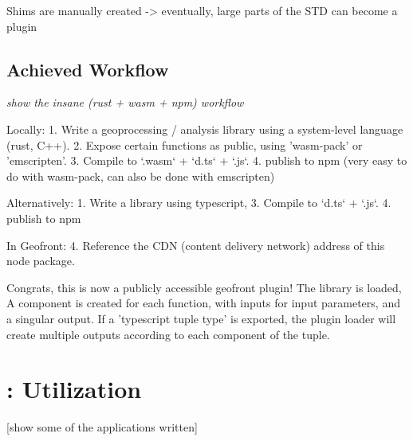Shims are manually created
-> eventually, large parts of the STD can become a plugin


\subsection{Achieved Workflow}
\emph{show the insane (rust + wasm + npm) workflow}

Locally: 
1. Write a geoprocessing / analysis library using a system-level language (rust, C++).
2. Expose certain functions as public, using 'wasm-pack' or 'emscripten'.
3. Compile to `.wasm` + `d.ts` + `.js`.
4. publish to npm (very easy to do with wasm-pack, can also be done with emscripten)

Alternatively: 
1. Write a library using typescript, 
3. Compile to `d.ts` + `.js`.
4. publish to npm 

In Geofront: 
4. Reference the CDN (content delivery network) address of this node package. 

Congrats, this is now a publicly accessible geofront plugin!
The library is loaded, A component is created for each function, with inputs for input parameters, and a singular output. If a 'typescript tuple type' is exported, the plugin loader will create multiple outputs according to each component of the tuple.




\section{\mySubRQFourTitle: Utilization}
\label{sec:implementation:utilization}

[show some of the applications written]